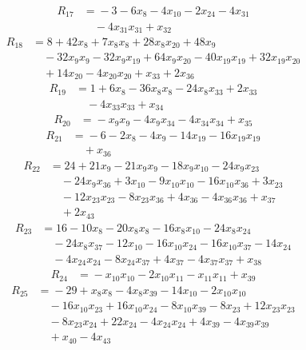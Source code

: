 \begin{align*}
R_{17}&={}-3 -6x_{8} -4x_{10} -2x_{24} -4x_{31}\\
&\quad{}-4x_{31}x_{31} +x_{32}
\end{align*}
\begin{align*}
R_{18}&={}8 +42x_{8} +7x_{8}x_{8} +28x_{8}x_{20} +48x_{9}\\
&\quad{}-32x_{9}x_{9} -32x_{9}x_{19} +64x_{9}x_{20} -40x_{19}x_{19} +32x_{19}x_{20}\\
&\quad{}+14x_{20} -4x_{20}x_{20} +x_{33} +2x_{36}
\end{align*}
\begin{align*}
R_{19}&={}1 +6x_{8} -36x_{8}x_{8} -24x_{8}x_{33} +2x_{33}\\
&\quad{}-4x_{33}x_{33} +x_{34}
\end{align*}
\begin{align*}
R_{20}&={}-x_{9}x_{9} -4x_{9}x_{34} -4x_{34}x_{34} +x_{35}
\end{align*}
\begin{align*}
R_{21}&={}-6 -2x_{8} -4x_{9} -14x_{19} -16x_{19}x_{19}\\
&\quad{}+x_{36}
\end{align*}
\begin{align*}
R_{22}&={}24 +21x_{9} -21x_{9}x_{9} -18x_{9}x_{10} -24x_{9}x_{23}\\
&\quad{}-24x_{9}x_{36} +3x_{10} -9x_{10}x_{10} -16x_{10}x_{36} +3x_{23}\\
&\quad{}-12x_{23}x_{23} -8x_{23}x_{36} +4x_{36} -4x_{36}x_{36} +x_{37}\\
&\quad{}+2x_{43}
\end{align*}
\begin{align*}
R_{23}&={}16 -10x_{8} -20x_{8}x_{8} -16x_{8}x_{10} -24x_{8}x_{24}\\
&\quad{}-24x_{8}x_{37} -12x_{10} -16x_{10}x_{24} -16x_{10}x_{37} -14x_{24}\\
&\quad{}-4x_{24}x_{24} -8x_{24}x_{37} +4x_{37} -4x_{37}x_{37} +x_{38}
\end{align*}
\begin{align*}
R_{24}&={}-x_{10}x_{10} -2x_{10}x_{11} -x_{11}x_{11} +x_{39}
\end{align*}
\begin{align*}
R_{25}&={}-29 +x_{8}x_{8} -4x_{8}x_{39} -14x_{10} -2x_{10}x_{10}\\
&\quad{}-16x_{10}x_{23} +16x_{10}x_{24} -8x_{10}x_{39} -8x_{23} +12x_{23}x_{23}\\
&\quad{}-8x_{23}x_{24} +22x_{24} -4x_{24}x_{24} +4x_{39} -4x_{39}x_{39}\\
&\quad{}+x_{40} -4x_{43}
\end{align*}
